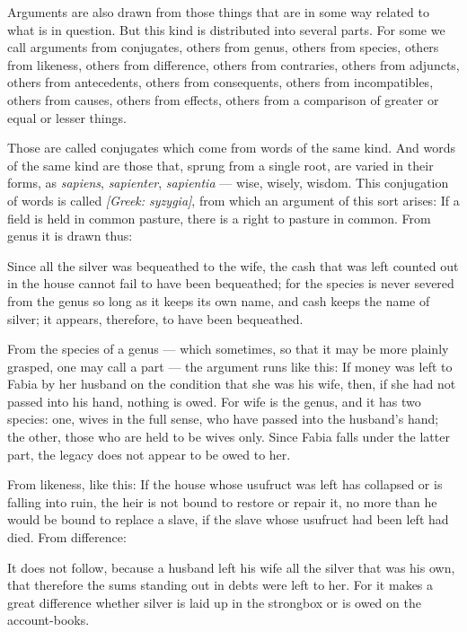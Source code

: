  Arguments are also drawn from those things that are in some way related to what is in question. But this kind is distributed into several parts. For some we call arguments from conjugates, others from genus, others from species, others from likeness, others from difference, others from contraries, others from adjuncts, others from antecedents, others from consequents, others from incompatibles, others from causes, others from effects, others from a comparison of greater or equal or lesser things.

 Those are called conjugates which come from words of the same kind. And words of the same kind are those that, sprung from a single root, are varied in their forms, as \textit{sapiens}, \textit{sapienter}, \textit{sapientia} — wise, wisely, wisdom. This conjugation of words is called \textit{[Greek: syzygia]}, from which an argument of this sort arises: If a field is held in common pasture, there is a right to pasture in common. From genus it is drawn thus:

 Since all the silver was bequeathed to the wife, the cash that was left counted out in the house cannot fail to have been bequeathed; for the species is never severed from the genus so long as it keeps its own name, and cash keeps the name of silver; it appears, therefore, to have been bequeathed.

 From the species of a genus — which sometimes, so that it may be more plainly grasped, one may call a part — the argument runs like this: If money was left to Fabia by her husband on the condition that she was his wife, then, if she had not passed into his hand, nothing is owed. For wife is the genus, and it has two species: one, wives in the full sense, who have passed into the husband's hand; the other, those who are held to be wives only. Since Fabia falls under the latter part, the legacy does not appear to be owed to her.

 From likeness, like this: If the house whose usufruct was left has collapsed or is falling into ruin, the heir is not bound to restore or repair it, no more than he would be bound to replace a slave, if the slave whose usufruct had been left had died. From difference:

 It does not follow, because a husband left his wife all the silver that was his own, that therefore the sums standing out in debts were left to her. For it makes a great difference whether silver is laid up in the strongbox or is owed on the account-books.

